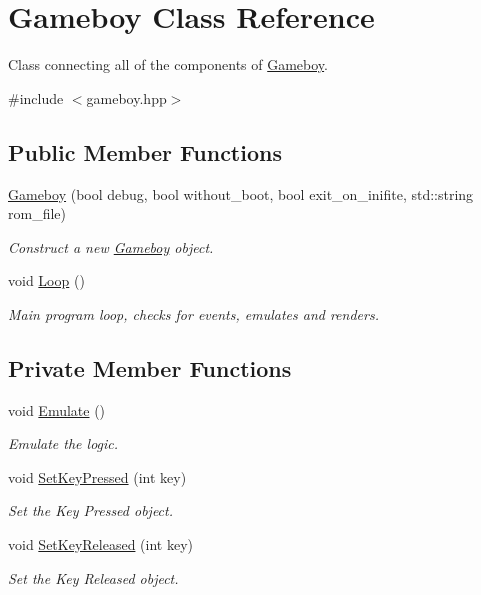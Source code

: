 \hypertarget{classGameboy}{}\section{Gameboy Class Reference}
\label{classGameboy}


Class connecting all of the components of \mbox{\hyperlink{classGameboy}{Gameboy}}.  




{\ttfamily \#include $<$gameboy.\+hpp$>$}

\subsection*{Public Member Functions}
\begin{DoxyCompactItemize}
\item 
\mbox{\hyperlink{classGameboy_a2d4e84cda18ef3429a3dff15c7610265}{Gameboy}} (bool debug, bool without\+\_\+boot, bool exit\+\_\+on\+\_\+inifite, std\+::string rom\+\_\+file)
\begin{DoxyCompactList}\small\item\em Construct a new \mbox{\hyperlink{classGameboy}{Gameboy}} object. \end{DoxyCompactList}\item 
\mbox{\label{classGameboy_ae61353b933089cf137da173a60fc59af}} 
void \mbox{\hyperlink{classGameboy_ae61353b933089cf137da173a60fc59af}{Loop}} ()
\begin{DoxyCompactList}\small\item\em Main program loop, checks for events, emulates and renders. \end{DoxyCompactList}\end{DoxyCompactItemize}
\subsection*{Private Member Functions}
\begin{DoxyCompactItemize}
\item 
\mbox{\label{classGameboy_a0ff1e6cb04a2738296f238bf8205e62d}} 
void \mbox{\hyperlink{classGameboy_a0ff1e6cb04a2738296f238bf8205e62d}{Emulate}} ()
\begin{DoxyCompactList}\small\item\em Emulate the logic. \end{DoxyCompactList}\item 
void \mbox{\hyperlink{classGameboy_a3da39e9c3ceb617ecf9070b71287a2af}{Set\+Key\+Pressed}} (int key)
\begin{DoxyCompactList}\small\item\em Set the Key Pressed object. \end{DoxyCompactList}\item 
void \mbox{\hyperlink{classGameboy_a6ce894c73585fc90233c556a821a4e55}{Set\+Key\+Released}} (int key)
\begin{DoxyCompactList}\small\item\em Set the Key Released object. \end{DoxyCompactList}\end{DoxyCompactItemize}
